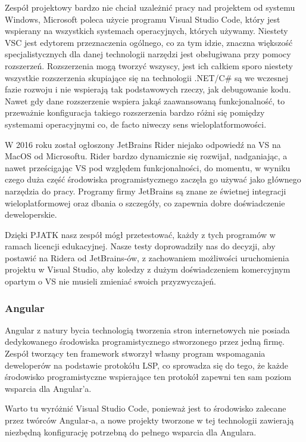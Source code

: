 Zespół projektowy bardzo nie chciał uzależnić pracy nad projektem od systemu Windows, Microsoft poleca użycie programu Visual Studio Code, który jest wspierany na wszystkich systemach operacyjnych, których używamy.
Niestety VSC jest edytorem przeznaczenia ogólnego, co za tym idzie, znaczna większość specjalistycznych dla danej technologii narzędzi jest obsługiwana przy pomocy rozszerzeń.
Rozszerzenia mogą tworzyć wszyscy, jest ich całkiem sporo niestety wszystkie rozszerzenia skupiające się na technologii .NET/C\# są we wczesnej fazie rozwoju i nie wspierają tak podstawowych rzeczy, jak debugowanie kodu.
Nawet gdy dane rozszerzenie wspiera jakąś zaawansowaną funkcjonalność, to przeważnie konfiguracja takiego rozszerzenia bardzo różni się pomiędzy systemami operacyjnymi co, de facto niweczy sens wieloplatformowości.

W 2016 roku został ogłoszony JetBrains Rider niejako odpowiedź na VS na MacOS od Microsoftu.
Rider bardzo dynamicznie się rozwijał, nadganiając, a nawet prześcigając VS pod względem funkcjonalności, do momentu, w wyniku czego duża część środowiska programistycznego zaczęła go używać jako głównego narzędzia do pracy.
Programy firmy JetBrains są znane ze świetnej integracji wieloplatformowej oraz dbania o szczegóły, co zapewnia dobre doświadczenie deweloperskie.

Dzięki PJATK nasz zespół mógł przetestować, każdy z tych programów w ramach licencji edukacyjnej.
Nasze testy doprowadziły nas do decyzji, aby postawić na Ridera od JetBrains-ów, z zachowaniem możliwości uruchomienia projektu w Visual Studio, aby koledzy z dużym doświadczeniem komercyjnym opartym o VS nie musieli zmieniać swoich przyzwyczajeń.

\subsubsection{Angular}
Angular z natury bycia technologią tworzenia stron internetowych nie posiada dedykowanego środowiska programistycznego stworzonego przez jedną firmę.
Zespół tworzący ten framework stworzył własny program wspomagania deweloperów na podstawie protokółu LSP, co sprowadza się do tego, że każde środowisko programistyczne wspierające ten protokół zapewni ten sam poziom wsparcia dla Angular'a.

Warto tu wyróżnić Visual Studio Code, ponieważ jest to środowisko zalecane przez twórców Angular-a, a nowe projekty tworzone w tej technologii zawierają niezbędną konfigurację potrzebną do pełnego wsparcia dla Angulara.


